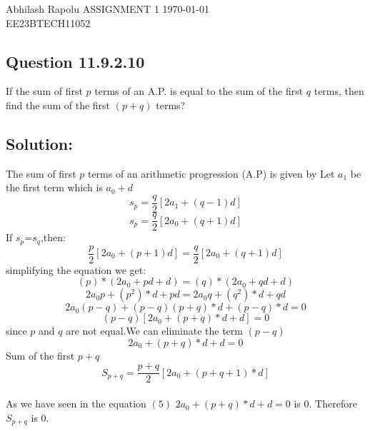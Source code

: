 \documentclass[12pt]{article}
\begin{document}
 Abhilash Rapolu \hfill {\Large ASSIGNMENT 1} \hfill \today
\\EE23BTECH11052
\subsection*{Question 11.9.2.10}
 If the sum of first $p$ terms of an A.P. is equal to the sum of the first $q$ terms, then
 find the sum of the first $(p + q)$ terms?

\subsection*{Solution:}
The sum of first $p$ terms of an arithmetic progression (A.P) is given by
\bgroup \obeylines
Let $a_1$ be the first term which is $a_0+d$
$$s_p =\frac{q}{2}[2a_1+(q-1)d]$$
$$s_p =\frac{q}{2}[2a_0+(q+1)d]$$
If $s_p$=$s_q$,then:
$$\frac{p}{2}[2a_0+(p+1)d]=\frac{q}{2}[2a_0+(q+1)d]$$
simplifying the equation we get:
\egroup
\begin{equation}
(p)*(2a_0+pd+d)=(q)*(2a_0+qd+d)
\end{equation}
\begin{equation}
2a_0p+(p^2)*d+pd=2a_0q+(q^2)*d+qd
\end{equation}
\begin{equation}
2a_0(p-q)+(p-q)(p+q)*d+(p-q)*d=0
\end{equation}
\begin{equation}
(p-q)[2a_0+(p+q)*d+d]=0
\end{equation}
since $p$ and $q$ are not equal.We can eliminate the term $(p-q)$
\begin{equation}
2a_0+(p+q)*d+d=0
\end{equation}
 Sum of the first $p+q$
$$S_{p+q}=\frac{p+q}{2}[2a_0+(p+q+1)*d]$$
\\As we have seen in the equation $(5)$ $2a_0+(p+q)*d+d=0$ is $0$.
 Therefore $S_{p+q}$ is $0$.
\end{document}
